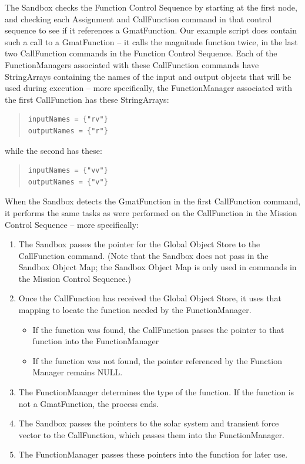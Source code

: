 The Sandbox checks the Function Control Sequence by starting at the first node, and checking each
Assignment and CallFunction command in that control sequence to see if it references a GmatFunction.
 Our example script does contain such a call to a GmatFunction -- it calls the magnitude function
twice, in the last two CallFunction commands in the Function Control Sequence.  Each of the
FunctionManagers associated with these CallFunction commands have StringArrays containing the names
of the input and output objects that will be used during execution -- more specifically, the
FunctionManager associated with the first CallFunction has these StringArrays:

\begin{quote}
\begin{verbatim}
inputNames = {"rv"}
outputNames = {"r"}
\end{verbatim}
\end{quote}

\noindent while the second has these:

\begin{quote}
\begin{verbatim}
inputNames = {"vv"}
outputNames = {"v"}
\end{verbatim}
\end{quote}

When the Sandbox detects the GmatFunction in the first CallFunction command, it performs the same
tasks as were performed on the CallFunction in the Mission Control Sequence -- more specifically:

\begin{enumerate}
\item The Sandbox passes the pointer for the Global Object Store to the CallFunction command.  (Note
that the Sandbox does not pass in the Sandbox Object Map; the Sandbox Object Map is only used in
commands in the Mission Control Sequence.)
\item Once the CallFunction has received the Global Object Store, it uses that mapping to locate the
function needed by the FunctionManager.
\begin{itemize}
\item If the function was found, the CallFunction passes the pointer to that function into the
FunctionManager
\item If the function was not found, the pointer referenced by the Function Manager remains NULL.
\end{itemize}
\item The FunctionManager determines the type of the function.  If the function is not a
GmatFunction, the process ends.
\item The Sandbox passes the pointers to the solar system and transient force vector to the
CallFunction, which passes them into the FunctionManager.
\item The FunctionManager passes these pointers into the function for later use.
\end{enumerate}

